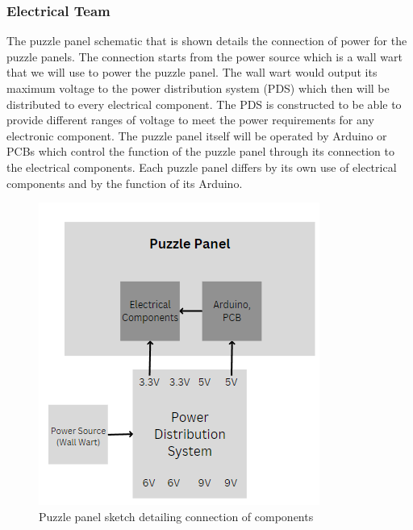 \documentclass[a4paper, 10pt]{article}
\begin{document}
\pagebreak

		\subsubsection{Electrical Team}
		The puzzle panel schematic that is shown details the connection of power for the puzzle panels. The connection starts from the power source which is a wall wart that we will use to power the puzzle panel. The wall wart would output its maximum voltage to the power distribution system (PDS) which then will be distributed to every electrical component. The PDS is constructed to be able to provide different ranges of voltage to meet the power requirements for any electronic component. The puzzle panel itself will be operated by Arduino or PCBs which control the function of the puzzle panel through its connection to the electrical components. Each puzzle panel differs by its own use of electrical components and by the function of its Arduino. 
	
		\begin{figure} [!h]
			\centering
			\includegraphics[scale=1.15]{Photos/Puzzle panel simplified}
			\caption{Puzzle panel sketch detailing connection of components}
			\label{puzzle_panel_schema}
		\end{figure}
		
\end{document}
